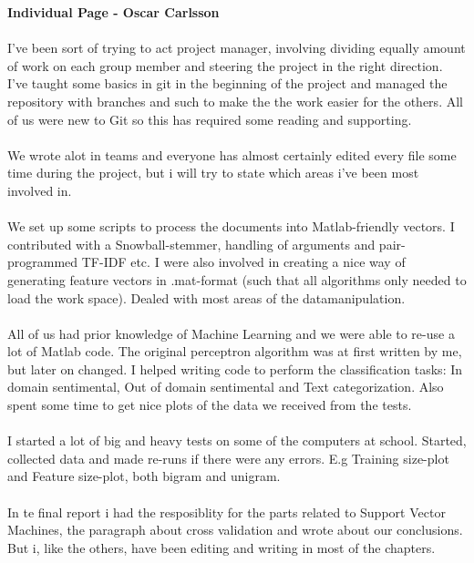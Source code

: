 \newpage
\textbf{Individual Page - Oscar Carlsson} \\\\
I've been sort of trying to act project manager, involving dividing equally amount of work on each group member and steering the project in the right direction. I've taught some basics in git in the beginning of the project and managed the repository with branches and such to make the the work easier for the others. All of us were new to Git so this has required some reading and supporting. \\\\
We wrote alot in teams and everyone has almost certainly edited every file some time during the project, but i will try to state which areas i've been most involved in. \\\\
We set up some scripts to process the documents into Matlab-friendly vectors. I contributed with a Snowball-stemmer, handling of arguments and pair-programmed TF-IDF etc. I were also involved in creating a nice way of generating feature vectors in .mat-format (such that all algorithms only needed to load the work space). Dealed with most areas of the datamanipulation.\\\\
All of us had prior knowledge of Machine Learning and we were able to re-use a lot of Matlab code. The original perceptron algorithm was at first written by me, but later on changed. I helped writing code to perform the classification tasks: In domain sentimental, Out of domain sentimental and Text categorization. Also spent some time to get nice plots of the data we received from the tests.\\\\
I started a lot of big and heavy tests on some of the computers at school. Started, collected data and made re-runs if there were any errors. E.g Training size-plot and Feature size-plot, both bigram and unigram.\\\\
In te final report i had the resposiblity for the parts related to Support Vector Machines, the paragraph about cross validation and wrote about our conclusions. But i, like the others, have been editing and writing in most of the chapters.\\\\